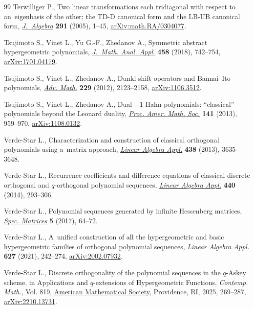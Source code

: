 \documentclass[10pt,a4paper]{amsart}
\numberwithin{equation}{section}
\begin{document}
\begin{thebibliography}{99}
Terwilliger P., Two linear transformations each tridiagonal with respect to
 an~eigenbasis of the other; the {TD}-{D} canonical form and the {LB}-{UB}
 canonical form,
 \href{https://doi.org/10.1016/j.jalgebra.2005.05.033}{\textit{J.~Algebra}}
 \textbf{291} (2005), 1--45,
 \href{http://arxiv.org/abs/math.RA/0304077}{arXiv:math.RA/0304077}.

Tsujimoto S., Vinet L., Yu G.-F., Zhedanov A., Symmetric abstract hypergeometric
 polynomials,
 \href{https://doi.org/10.1016/j.jmaa.2017.09.033}{\textit{J.~Math. Anal.
 Appl.}} \textbf{458} (2018), 742--754,
 \href{http://arxiv.org/abs/1701.04179}{arXiv:1701.04179}.

Tsujimoto S., Vinet L., Zhedanov A., Dunkl shift operators and {B}annai--{I}to
 polynomials, \href{https://doi.org/10.1016/j.aim.2011.12.020}{\textit{Adv.
 Math.}} \textbf{229} (2012), 2123--2158,
 \href{http://arxiv.org/abs/1106.3512}{arXiv:1106.3512}.

Tsujimoto S., Vinet L., Zhedanov A., Dual {$-1$} {H}ahn polynomials:
 ``classical'' polynomials beyond the {L}eonard duality,
 \href{https://doi.org/10.1090/S0002-9939-2012-11469-8}{\textit{Proc. Amer.
 Math. Soc.}} \textbf{141} (2013), 959--970,
 \href{http://arxiv.org/abs/1108.0132}{arXiv:1108.0132}.

Verde-Star L., Characterization and construction of classical orthogonal
 polynomials using a~matrix approach,
 \href{https://doi.org/10.1016/j.laa.2013.01.014}{\textit{Linear Algebra
 Appl.}} \textbf{438} (2013), 3635--3648.

Verde-Star L., Recurrence coefficients and difference equations of classical
 discrete orthogonal and {$q$}-orthogonal polynomial sequences,
 \href{https://doi.org/10.1016/j.laa.2013.10.051}{\textit{Linear Algebra
 Appl.}} \textbf{440} (2014), 293--306.

Verde-Star L., Polynomial sequences generated by infinite {H}essenberg
 matrices, \href{https://doi.org/10.1515/spma-2017-0002}{\textit{Spec.
 Matrices}} \textbf{5} (2017), 64--72.

Verde-Star L., A~unified construction of all the hypergeometric and basic
 hypergeometric families of orthogonal polynomial sequences,
 \href{https://doi.org/10.1016/j.laa.2021.06.012}{\textit{Linear Algebra
 Appl.}} \textbf{627} (2021), 242--274,
 \href{http://arxiv.org/abs/2002.07932}{arXiv:2002.07932}.

Verde-Star L., Discrete orthogonality of the polynomial sequences in the
 {$q$}-{A}skey scheme, in Applications and {$q$}-extensions of Hypergeometric
 Functions, \textit{Contemp. Math.}, Vol. 819,
 \href{https://doi.org/10.1090/conm/819/16398}{American Mathematical Society},
 Providence, RI, 2025, 269--287,
 \href{http://arxiv.org/abs/2210.13731}{arXiv:2210.13731}.


\end{thebibliography}
\end{document}

